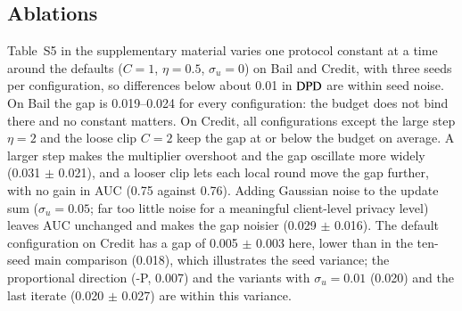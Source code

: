 \subsection{Ablations}\label{sec:ablation}
Table~S5 in the supplementary material varies one protocol constant at a time around the defaults ($C=1$, $\eta=0.5$, $\sigma_u=0$) on Bail and Credit, with three seeds per configuration, so differences below about 0.01 in $\mathrm{DPD}$ are within seed noise. On Bail the gap is 0.019--0.024 for every configuration: the budget does not bind there and no constant matters. On Credit, all configurations except the large step $\eta=2$ and the loose clip $C=2$ keep the gap at or below the budget on average. A larger step makes the multiplier overshoot and the gap oscillate more widely (0.031 $\pm$ 0.021), and a looser clip lets each local round move the gap further, with no gain in AUC (0.75 against 0.76). Adding Gaussian noise to the update sum ($\sigma_u=0.05$; far too little noise for a meaningful client-level privacy level) leaves AUC unchanged and makes the gap noisier (0.029 $\pm$ 0.016). The default configuration on Credit has a gap of 0.005 $\pm$ 0.003 here, lower than in the ten-seed main comparison (0.018), which illustrates the seed variance; the proportional direction (\clamp{}-P, 0.007) and the variants with $\sigma_u=0.01$ (0.020) and the last iterate (0.020 $\pm$ 0.027) are within this variance.
